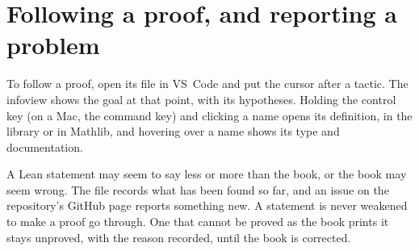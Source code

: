 \section*{Following a proof, and reporting a problem}

To follow a proof, open its file in VS~Code and put the cursor after a
tactic. The infoview shows the goal at that point, with its hypotheses.
Holding the control key (on a Mac, the command key) and clicking a name opens
its definition, in the library or in Mathlib, and hovering over a name shows
its type and documentation.

A Lean statement may seem to say less or more than the book, or the book may
seem wrong. The file  records what has been found
so far, and an issue on the repository's GitHub page reports something new.
A statement is never weakened to make a proof go through. One that cannot be
proved as the book prints it stays unproved, with the reason recorded, until
the book is corrected.
